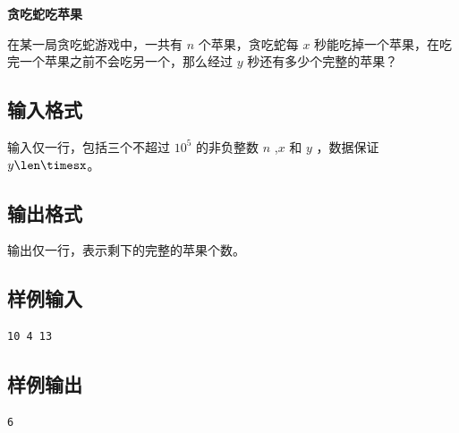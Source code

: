 \documentclass{article}
\newcommand{\problemname}[1]{\begin{center}\Large\bfseries #1\end{center}}
\begin{document}
\problemname{贪吃蛇吃苹果}

在某一局贪吃蛇游戏中，一共有 $n$ 个苹果，贪吃蛇每 $x$ 秒能吃掉一个苹果，在吃完一个苹果之前不会吃另一个，那么经过 $y$ 秒还有多少个完整的苹果？

\subsection*{输入格式}
输入仅一行，包括三个不超过 $10^{5}$ 的非负整数 $n$ ,$x$ 和 $y$ ，数据保证 $y\len\timesx$。

\subsection*{输出格式}
输出仅一行，表示剩下的完整的苹果个数。

\subsection*{样例输入}
\begin{verbatim}
10 4 13
\end{verbatim}

\subsection*{样例输出}
\begin{verbatim}
6
\end{verbatim}
\end{document}
